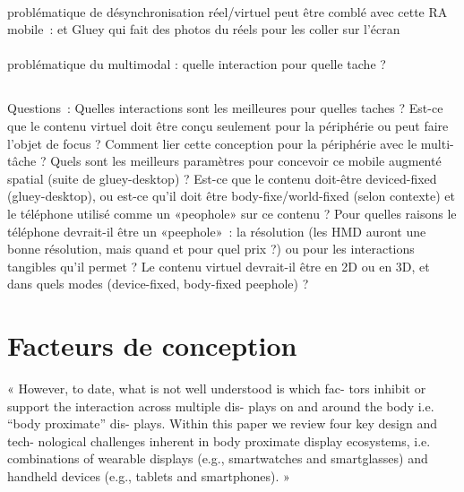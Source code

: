 \paragraph*{}
problématique de désynchronisation réel/virtuel peut être comblé avec cette RA mobile~: \cite{Chalon2004} et Gluey qui fait des photos du réels pour les coller sur l'écran

\paragraph*{}
problématique du multimodal : quelle interaction pour quelle tache ?


\subsection*{} %
Questions~: Quelles interactions sont les meilleures pour quelles taches ? Est-ce que le contenu virtuel doit être conçu seulement pour la périphérie ou peut faire l'objet de focus ? Comment lier cette conception pour la périphérie avec le multi-tâche ? Quels sont les meilleurs paramètres pour concevoir ce mobile augmenté spatial (suite de gluey-desktop) ? Est-ce que le contenu doit-être deviced-fixed (gluey-desktop), ou est-ce qu'il doit être body-fixe/world-fixed (selon contexte) et le téléphone utilisé comme un «peophole» sur ce contenu ? Pour quelles raisons le téléphone devrait-il être un «peephole»~: la résolution (les HMD auront une bonne résolution, mais quand et pour quel prix ?) ou pour les interactions tangibles qu'il permet ? Le contenu virtuel devrait-il être en 2D ou en 3D, et dans quels modes (device-fixed, body-fixed peephole) ? 



\section*{Facteurs de conception}
« However, to date, what is not well understood is which fac-
tors inhibit or support the interaction across multiple dis-
plays on and around the body i.e. “body proximate” dis-
plays. Within this paper we review four key design and tech-
nological challenges inherent in body proximate display
ecosystems, i.e. combinations of wearable displays (e.g.,
smartwatches and smartglasses) and handheld devices
(e.g., tablets and smartphones). » \cite{GrubertKranzQuigley2015} %

